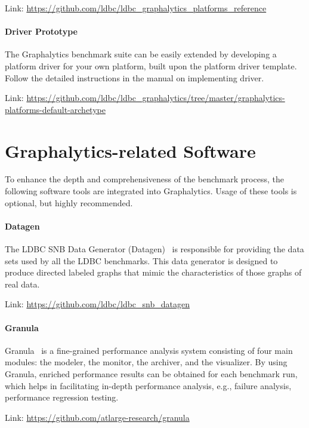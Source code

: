\quad Link: \url{https://github.com/ldbc/ldbc_graphalytics_platforms_reference}


\paragraph{Driver Prototype} The Graphalytics benchmark suite can be easily extended by developing a platform driver for your own platform, built upon the platform driver template. Follow the detailed instructions in the manual on implementing driver. 

\quad Link: \url{https://github.com/ldbc/ldbc_graphalytics/tree/master/graphalytics-platforms-default-archetype}








\section{Graphalytics-related Software}\label{sec:instructions:related}
To enhance the depth and comprehensiveness of the benchmark process, the following software tools are integrated into Graphalytics. Usage of these tools is optional, but highly recommended.


\paragraph{Datagen} The LDBC SNB Data Generator (Datagen)~\cite{DBLP:conf/sigmod/ErlingALCGPPB15} is responsible for providing the data sets used by all the LDBC benchmarks. This data generator is designed to produce directed labeled graphs that mimic the characteristics of those graphs of real data. 

\quad Link: \url{https://github.com/ldbc/ldbc_snb_datagen}



\paragraph{Granula} Granula~\cite{DBLP:conf/grades/NgaiHHI17} is a fine-grained performance analysis system consisting of four main modules: the modeler, the monitor, the archiver, and the visualizer. 
By using Granula, enriched performance results can be obtained for each benchmark run, which helps in facilitating in-depth performance analysis, e.g., failure analysis, performance regression testing.

\quad Link: \url{https://github.com/atlarge-research/granula}







